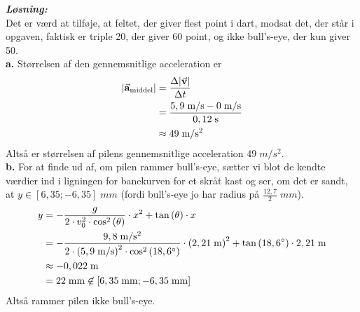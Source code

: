 \documentclass{report}
\newcommand{\sol}{\setlength{\parindent}{0cm}\textbf{\textit{Løsning:}}\setlength{\parindent}{1cm}}
\begin{document}
\sol \\
Det er værd at tilføje, at feltet, der giver flest point i dart, modsat det, der står i opgaven, faktisk er triple 20, der giver 60 point, og ikke bull's-eye, der kun giver 50.\\[1ex]
\textbf{a.}
Størrelsen af den gennemsnitlige acceleration er 
\begin{equation*}
\begin{split}
  \abs{\va{a} _{\text{middel} }}&=\frac{\Delta \abs{\va{v}}}{\Delta t}\\ 
  &=\frac{5,9 \;\unit{m/s} -0 \;\unit{m/s} }{0,12 \;\unit{s} }\\ 
  &\approx 49 \;\unit{m/s^2} 
\end{split}
\end{equation*}
Altså er størrelsen af pilens gennemsnitlige acceleration $49 \;\unit{m/s^2} $.\\[1ex]
\textbf{b.}
For at finde ud af, om pilen rammer bull's-eye, sætter vi blot de kendte værdier ind i ligningen for banekurven for et skråt kast og ser, om det er sandt, at $y \in [6,35;-6,35] \;\unit{mm} $ (fordi bull's-eye jo har radius på $\frac{12,7}{2}\;\unit{mm}$).
\begin{equation*}
\begin{split}
  y&=-\frac{g}{2 \cdot v_0^2 \cdot \cos^2\left(\theta\right) }\cdot x^2 + \tan\left(\theta\right) \cdot x\\ 
  &=-\frac{9,8 \;\unit{m/s^2} }{2 \cdot \left(5,9 \;\unit{m/s} \right)^2 \cdot \cos^2\left(18,6 \degree \right) }\cdot \left(2,21 \;\unit{m} \right)^2 + \tan\left(18,6 \degree \right) \cdot 2,21 \;\unit{m} \\ 
  &\approx -0,022 \;\unit{m} \\ 
  &=22 \;\unit{mm} \not\in [6,35\;\unit{mm};-6,35\;\unit{mm}]  
\end{split}
\end{equation*}
Altså rammer pilen ikke bull's-eye.
\end{document}
